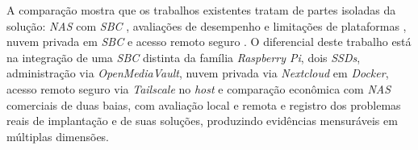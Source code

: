 A comparação mostra que os trabalhos existentes tratam de partes isoladas da solução: \textit{NAS} com \textit{SBC} \cite{ritzkal2023,homenas2025}, avaliações de desempenho e limitações de plataformas \cite{gamess2025,gamess2022,johnston2018}, nuvem privada em \textit{SBC} \cite{salke2023} e acesso remoto seguro \cite{donenfeld2017,tailscalehowworks}. O diferencial deste trabalho está na integração de uma \textit{SBC} distinta da família \textit{Raspberry Pi}, dois \textit{SSDs}, administração via \textit{OpenMediaVault}, nuvem privada via \textit{Nextcloud} em \textit{Docker}, acesso remoto seguro via \textit{Tailscale} no \textit{host} e comparação econômica com \textit{NAS} comerciais de duas baias, com avaliação local e remota e registro dos problemas reais de implantação e de suas soluções, produzindo evidências mensuráveis em múltiplas dimensões.
